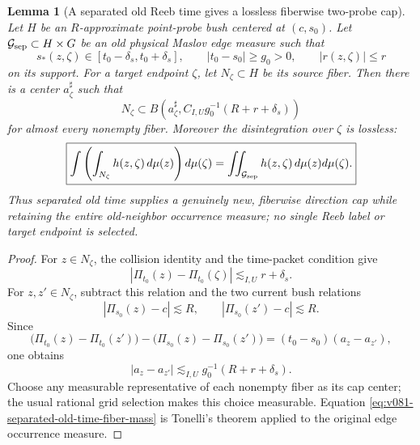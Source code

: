 \documentclass[10pt]{article}
\newtheorem{lemma}[theorem]{Lemma}
\begin{document}
\begin{lemma}[A separated old Reeb time gives a lossless fiberwise two-probe cap]
\label{lem:v081-separated-old-time-fiber-cap}
Let \(H\) be an \(R\)-approximate point-probe bush centered at \((c,s_0)\).  Let
\(\mathcal G_{\rm sep}\subset H\times G\) be an old physical Maslov edge measure such that
\[
s_*(z,\zeta)\in[t_0-\delta_s,t_0+\delta_s],
\qquad
|t_0-s_0|\ge g_0>0,
\qquad
|r(z,\zeta)|\le r
\]
on its support.  For a target endpoint \(\zeta\), let \(N_\zeta\subset H\) be its source fiber.
Then there is a center \(a_\zeta^\sharp\) such that
\begin{equation}
\label{eq:v081-separated-old-time-fiber-cap}
\boxed{
N_\zeta
\subset
B\!\left(
a_\zeta^\sharp,
C_{I,U}g_0^{-1}(R+r+\delta_s)
\right)
}
\end{equation}
for almost every nonempty fiber.  Moreover the disintegration over \(\zeta\) is lossless:
\begin{equation}
\label{eq:v081-separated-old-time-fiber-mass}
\boxed{
\int
\left(
\int_{N_\zeta}h(z,\zeta)\,d\mu(z)
\right)d\mu(\zeta)
=
\iint_{\mathcal G_{\rm sep}}h(z,\zeta)\,d\mu(z)d\mu(\zeta).
}
\end{equation}
Thus separated old time supplies a genuinely new, fiberwise direction cap while retaining the
entire old-neighbor occurrence measure; no single Reeb label or target endpoint is selected.
\end{lemma}

\begin{proof}
For \(z\in N_\zeta\), the collision identity and the time-packet condition give
\[
|\Pi_{t_0}(z)-\Pi_{t_0}(\zeta)|
\lesssim_{I,U}
r+\delta_s.
\]
For \(z,z'\in N_\zeta\), subtract this relation and the two current bush relations
\[
|\Pi_{s_0}(z)-c|\lesssim R,
\qquad
|\Pi_{s_0}(z')-c|\lesssim R.
\]
Since
\[
\bigl(\Pi_{t_0}(z)-\Pi_{t_0}(z')\bigr)
-
\bigl(\Pi_{s_0}(z)-\Pi_{s_0}(z')\bigr)
=
(t_0-s_0)(a_z-a_{z'}),
\]
one obtains
\[
|a_z-a_{z'}|
\lesssim_{I,U}
g_0^{-1}(R+r+\delta_s).
\]
Choose any measurable representative of each nonempty fiber as its cap center; the usual rational
grid selection makes this choice measurable.  Equation
\eqref{eq:v081-separated-old-time-fiber-mass} is Tonelli's theorem applied to the original
edge occurrence measure.
\end{proof}
\end{document}
